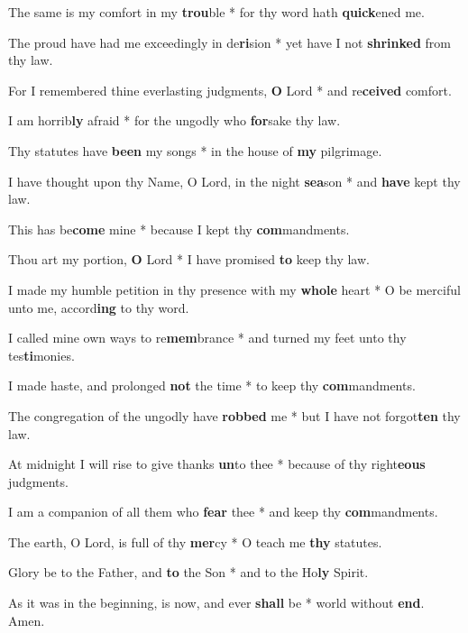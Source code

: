 \begin{multicols}{2}
	The same is my comfort in my \textbf{trou}ble * for thy word hath \textbf{quick}ened me.
	
	The proud have had me exceedingly in de\textbf{ri}sion * yet have I not \textbf{shrinked} from thy law.
	
	For I remembered thine everlasting judgments, \textbf{O} Lord * and re\textbf{ceived} comfort.
	
	I am horrib\textbf{ly} afraid * for the ungodly who \textbf{for}sake thy law.
	
	Thy statutes have \textbf{been} my songs * in the house of \textbf{my} pilgrimage.
	
	I have thought upon thy Name, O Lord, in the night \textbf{sea}son * and \textbf{have} kept thy law.
	
	This has be\textbf{come} mine * because I kept thy \textbf{com}mandments.
	
	Thou art my portion, \textbf{O} Lord * I have promised \textbf{to} keep thy law.
	
	I made my humble petition in thy presence with my \textbf{whole} heart * O be merciful unto me, accord\textbf{ing} to thy word.
	
	I called mine own ways to re\textbf{mem}brance * and turned my feet unto thy tes\textbf{ti}monies.
	
	I made haste, and prolonged \textbf{not} the time * to keep thy \textbf{com}mandments.
	
	The congregation of the ungodly have \textbf{robbed} me * but I have not forgot\textbf{ten} thy law.
	
	At midnight I will rise to give thanks \textbf{un}to thee * because of thy right\textbf{eous} judgments.
	
	I am a companion of all them who \textbf{fear} thee * and keep thy \textbf{com}mandments.
	
	The earth, O Lord, is full of thy \textbf{mer}cy * O teach me \textbf{thy} statutes.
	
	Glory be to the Father, and \textbf{to} the Son * and to the Ho\textbf{ly} Spirit.
	
	As it was in the beginning, is now, and ever \textbf{shall} be * world without \textbf{end}. Amen.
\end{multicols}
